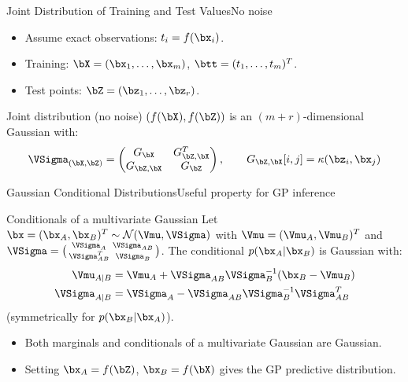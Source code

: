 \begin{frame}{Joint Distribution of Training and Test Values}{No noise}
  \begin{itemize}
    \item Assume exact observations: $t_i=f(\bx_i)$.
    \item Training: $\bX=(\bx_1,\ldots,\bx_m)$, $\btt=(t_1,\ldots,t_m)^T$.
    \item Test points: $\bZ=(\bz_1,\ldots,\bz_r)$.
  \end{itemize}

  \medskip
  \begin{block}{Joint distribution (no noise)}
    $(f(\bX),f(\bZ))$ is an $(m+r)$-dimensional Gaussian with:
    \[
      \VSigma_{(\bX,\bZ)}=
      \begin{pmatrix}G_{\bX} & G_{\bZ,\bX}^T \\ G_{\bZ,\bX} & G_{\bZ}\end{pmatrix},
      \qquad
      G_{\bZ,\bX}[i,j]=\kappa(\bz_i,\bx_j)
    \]
  \end{block}
\end{frame}

\begin{frame}{Gaussian Conditional Distributions}{Useful property for GP inference}
  \begin{block}{Conditionals of a multivariate Gaussian}
    Let $\bx=(\bx_A,\bx_B)^T\sim\mathcal{N}(\Vmu,\VSigma)$ with
    $\Vmu=(\Vmu_A,\Vmu_B)^T$ and
    $\VSigma=\bigl(\begin{smallmatrix}\VSigma_A & \VSigma_{AB}\\\VSigma_{AB}^T & \VSigma_B\end{smallmatrix}\bigr)$.
    The conditional $p(\bx_A|\bx_B)$ is Gaussian with:
    \begin{align*}
      \Vmu_{A|B} &= \Vmu_A + \VSigma_{AB}\VSigma_B^{-1}(\bx_B-\Vmu_B)\\
      \VSigma_{A|B} &= \VSigma_A - \VSigma_{AB}\VSigma_B^{-1}\VSigma_{AB}^T
    \end{align*}
    (symmetrically for $p(\bx_B|\bx_A)$).
  \end{block}

  \medskip
  \begin{itemize}
    \item Both marginals and conditionals of a multivariate Gaussian are Gaussian.
    \item Setting $\bx_A=f(\bZ)$, $\bx_B=f(\bX)$ gives the GP predictive distribution.
  \end{itemize}
\end{frame}

